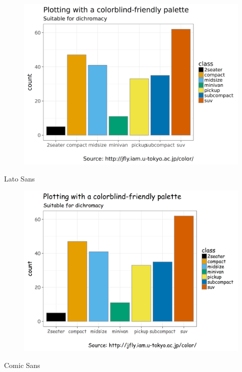 
\begin{frame}
  \begin{figure}[htp!]
    \centering
    \includegraphics[width=0.9\linewidth]{fig/barchart-latosans.png}
  \end{figure}

  \small Lato Sans 
  
\end{frame}


\begin{frame}
  \begin{figure}[htp!]
    \centering
    \includegraphics[width=0.9\linewidth]{fig/barchart-comicsansms.png}
  \end{figure}

  \small Comic Sans
\end{frame}


